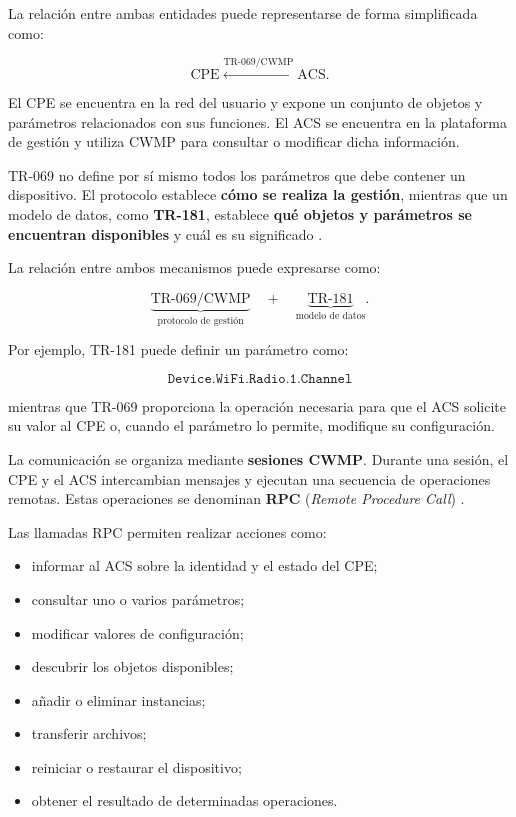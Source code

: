 La relación entre ambas entidades puede representarse de forma
simplificada como:

\[
    \text{CPE}
    \overset{\text{TR-069/CWMP}}{\longleftrightarrow}
    \text{ACS}.
\]

El CPE se encuentra en la red del usuario y expone un conjunto de objetos
y parámetros relacionados con sus funciones. El ACS se encuentra en la
plataforma de gestión y utiliza CWMP para consultar o modificar dicha
información.

TR-069 no define por sí mismo todos los parámetros que debe contener un
dispositivo. El protocolo establece \textbf{cómo se realiza la gestión},
mientras que un modelo de datos, como \textbf{TR-181}, establece
\textbf{qué objetos y parámetros se encuentran disponibles} y cuál es su
significado \cite{bbf_tr069,bbf_tr181}.

La relación entre ambos mecanismos puede expresarse como:

\[
    \underbrace{\text{TR-069/CWMP}}_{\text{protocolo de gestión}}
    \quad+\quad
    \underbrace{\text{TR-181}}_{\text{modelo de datos}}.
\]

Por ejemplo, TR-181 puede definir un parámetro como:

\[
    \texttt{Device.WiFi.Radio.1.Channel}
\]

mientras que TR-069 proporciona la operación necesaria para que el ACS
solicite su valor al CPE o, cuando el parámetro lo permite, modifique su
configuración.

La comunicación se organiza mediante \textbf{sesiones CWMP}. Durante una
sesión, el CPE y el ACS intercambian mensajes y ejecutan una secuencia de
operaciones remotas. Estas operaciones se denominan
\textbf{RPC} (\textit{Remote Procedure Call})
\cite{bbf_tr069}.

Las llamadas RPC permiten realizar acciones como:

\begin{itemize}
    \item informar al ACS sobre la identidad y el estado del CPE;
    \item consultar uno o varios parámetros;
    \item modificar valores de configuración;
    \item descubrir los objetos disponibles;
    \item añadir o eliminar instancias;
    \item transferir archivos;
    \item reiniciar o restaurar el dispositivo;
    \item obtener el resultado de determinadas operaciones.
\end{itemize}

